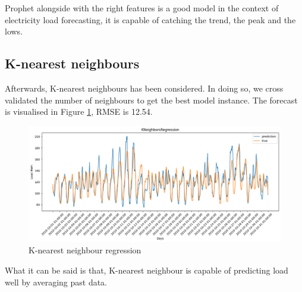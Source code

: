 
Prophet alongside with the right features is a good model in the context of electricity load forecasting, it is capable of catching the trend, the peak and the lows. 

\subsection{K-nearest neighbours}
Afterwards, K-nearest neighbours has been considered. In doing so, we cross validated the number of neighbours to get the best model instance. The forecast is visualised in Figure \ref{fig:knn_price}, RMSE is 12.54.
\begin{figure}[!h]
    \includegraphics[width=\textwidth]{images/knn_price.png}
    \caption{K-nearest neighbour regression}
    \label{fig:knn_price}
\end{figure}
What it can be said is that, K-nearest neighbour is capable of predicting load well by averaging past data.

